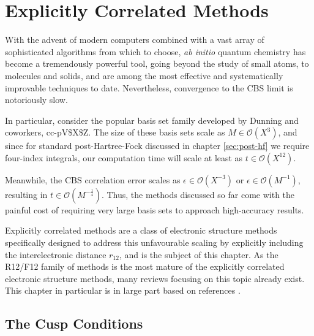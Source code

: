 \chapter{Explicitly Correlated Methods}
\label{chap:explicit}

With the advent of modern computers combined with a vast array of sophisticated algorithms from which to choose, \emph{ab initio} quantum chemistry has become a tremendously powerful tool, going beyond the study of small atoms, to molecules and solids, and are among the most effective and systematically improvable techniques to date. Nevertheless, convergence to the \gls{CBS} limit is notoriously slow.

In particular, consider the popular basis set family developed by Dunning and coworkers, \gls{cc-pV$X$Z}.\cite{dunningGaussian1989a,woonGaussian1993,woonGaussian1994,petersonBenchmark1994,wilsonGaussian1996}
The size of these basis sets scale as $M\in\mathcal{O}(X^3)$, and since for standard post-Hartree-Fock discussed in chapter \ref{sec:post-hf} we require four-index integrals, our computation time will scale at least as $t\in\mathcal{O}(X^{12})$.\cite{klopperR122007}

Meanwhile, the \gls{CBS} correlation error scales as $\epsilon\in\mathcal{O}(X^{-3})$ \cite{helgakerBasisset1997,halkierBasisset1998} or $\epsilon\in\mathcal{O}(M^{-1})$,\cite{klopperInitio1995} resulting in $t\in\mathcal{O}(M^{-\frac 14})$. Thus, the methods discussed so far come with the painful cost of requiring very large basis sets to approach high-accuracy results.

Explicitly correlated methods are a class of electronic structure methods specifically designed to address this unfavourable scaling by explicitly including the interelectronic distance $r_{12}$, and is the subject of this chapter. As the R12/F12 family of methods is the most mature of the explicitly correlated electronic structure methods, many reviews focusing on this topic already exist. This chapter in particular is in large part based on references \parencite{klopperR122007,gruneisPerspective2017,hattigExplicitly2012,shiozakiMultireference2013}.




\section{The Cusp Conditions}
\label{sec:cusp}

